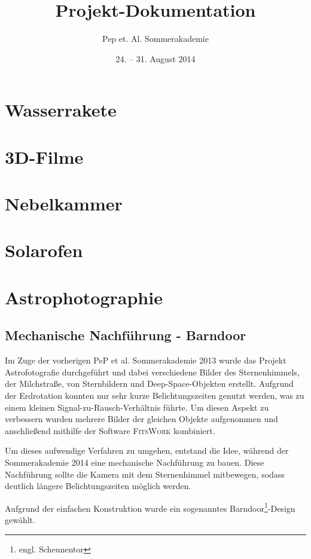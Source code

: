 
\title{Projekt-Dokumentation}
\subtitle{Pep et. Al. Sommerakademie}
\date{24. -- 31. August 2014}




\maketitle
\tableofcontents

\section{Wasserrakete}
\blindtext
\section{3D-Filme}
\blindtext
\section{Nebelkammer}
\blindtext
\section{Solarofen}
\blindtext

\section{Astrophotographie}

\subsection*{Mechanische Nachführung - Barndoor}

Im Zuge der vorherigen PeP et al. Sommerakademie 2013 wurde das Projekt
Astrofotografie durchgeführt und dabei verschiedene Bilder des Sternenhimmels,
der Milchstraße, von Sternbildern und Deep-Space-Objekten erstellt. Aufgrund der
Erdrotation konnten nur sehr kurze Belichtungszeiten genutzt werden, was zu
einem kleinen Signal-zu-Rausch-Verhältnis führte. Um diesen Aspekt zu verbessern
wurden mehrere Bilder der gleichen Objekte aufgenommen und anschließend mithilfe
der Software \textsc{FitsWork} kombiniert.

Um dieses aufwendige Verfahren zu umgehen, entstand die Idee, während der
Sommerakademie 2014 eine mechanische Nachführung zu bauen. Diese Nachführung
sollte die Kamera mit dem Sternenhimmel mitbewegen, sodass deutlich längere
Belichtungszeiten möglich werden.

Aufgrund der einfachen Konstruktion wurde ein sogenanntes
Barndoor\footnote{engl. Scheunentor}-Design gewählt.

